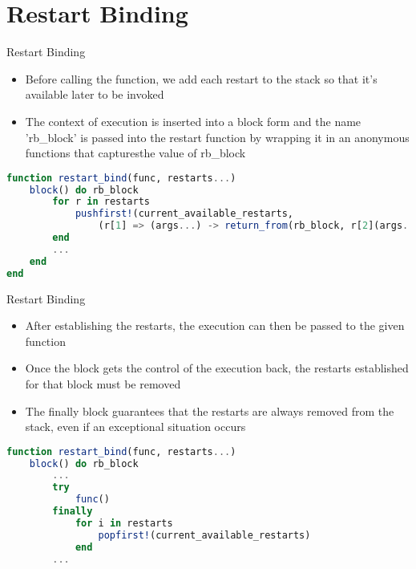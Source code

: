 \documentclass{beamer}
\begin{document}
\section{Restart Binding}
\begin{frame}[fragile,t]{Restart Binding}
    
\begin{itemize}
    \item Before calling the function, we add each restart to the stack so that it's available later to be invoked
    \item The context of execution is inserted into a block form and the name 'rb\_block' is passed into the restart function by wrapping it in an anonymous functions that capturesthe value of rb\_block
\end{itemize}
\vfill
\begin{lstlisting}[language=julia, style=jlcodestyle]
function restart_bind(func, restarts...)
    block() do rb_block
        for r in restarts
            pushfirst!(current_available_restarts,
                (r[1] => (args...) -> return_from(rb_block, r[2](args...))))
        end
        ...
    end
end
\end{lstlisting}
\end{frame}

\begin{frame}[fragile,t]{Restart Binding}
\begin{itemize}
    \item After establishing the restarts, the execution can then be passed to the given function
    \item Once the block gets the control of the execution back, the restarts established for that block must be removed
    \item The finally block guarantees that the restarts are always removed from the stack, even if an exceptional situation occurs
\end{itemize}
\begin{lstlisting}[language=julia, style=jlcodestyle]
function restart_bind(func, restarts...)
    block() do rb_block
        ...
        try
            func()
        finally
            for i in restarts
                popfirst!(current_available_restarts)
            end
        ...
\end{lstlisting}
\end{frame}

\end{document}
